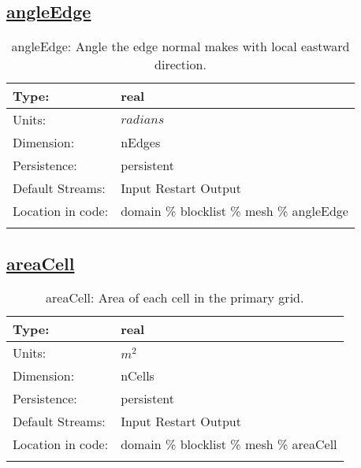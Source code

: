 \subsection[angleEdge]{\hyperref[sec:var_tab_mesh]{angleEdge}}
\label{subsec:var_sec_mesh_angleEdge}
\begin{center}
\begin{longtable}{| p{2.0in} | p{4.0in} |}
        \hline 
        Type: & real \\
        \hline 
        Units: & $radians$ \\
        \hline 
        Dimension: & nEdges \\
        \hline 
        Persistence: & persistent \\
        \hline 
		 Default Streams: & Input Restart Output  \\
        \hline 
		 Location in code: & domain \% blocklist \% mesh \% angleEdge \\
		 \hline 
    \caption{angleEdge: Angle the edge normal makes with local eastward direction.}
\end{longtable}
\end{center}
\subsection[areaCell]{\hyperref[sec:var_tab_mesh]{areaCell}}
\label{subsec:var_sec_mesh_areaCell}
\begin{center}
\begin{longtable}{| p{2.0in} | p{4.0in} |}
        \hline 
        Type: & real \\
        \hline 
        Units: & $m^2$ \\
        \hline 
        Dimension: & nCells \\
        \hline 
        Persistence: & persistent \\
        \hline 
		 Default Streams: & Input Restart Output  \\
        \hline 
		 Location in code: & domain \% blocklist \% mesh \% areaCell \\
		 \hline 
    \caption{areaCell: Area of each cell in the primary grid.}
\end{longtable}
\end{center}

